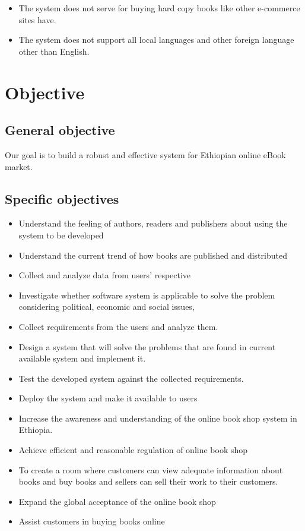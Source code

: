 \begin{itemize}
\item The system does not serve for buying hard copy books like other e-commerce sites have.
\item The system does not support all local languages and other foreign language other than English.
\end{itemize}

	\section{Objective}
		\subsection{General objective}

Our goal is to build a robust and effective system for Ethiopian online eBook market.

		\subsection{Specific objectives}

\begin{itemize}

	\item Understand the feeling of authors, readers and publishers about using the system to be developed
	\item Understand the current trend of how books are published and distributed
	\item Collect and analyze data from users’ respective 
	\item Investigate whether software system is applicable to solve the problem considering political, economic and social issues,
	\item Collect requirements from the users and analyze them.
	\item Design a system that will solve the problems that are found in current available system and implement it.
	\item Test the developed system against the collected requirements.
	\item Deploy the system and make it available to users
	\item Increase the awareness and understanding of the online book shop system in Ethiopia.
	\item Achieve efficient and reasonable regulation of online book shop
	\item To create a room where customers can view adequate information about books and buy books and sellers can sell their work to their customers.
	\item Expand the global acceptance of the online book shop
	\item Assist customers in buying books online

\end{itemize}

